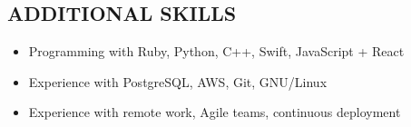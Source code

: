 \documentclass[centered, margin, 11pt]{res} %
\newcommand\mainsectionfont{\fontsize{10.5pt}{14pt}\selectfont\bf\textup}
\renewcommand\sectionfont{\mainsectionfont} %
\renewcommand\dates{\section} %
\newenvironment{rlist}
    {\begin{minipage}[t]{\linewidth}\begin{itemize}\raggedright}
    {\end{itemize}\end{minipage}}
\newenvironment{positionlist}
    {\begin{position}\begin{rlist}}
    {\end{rlist}\end{position}}
\begin{document}
\begin{resume}



\renewcommand\sectionfont{\mainsectionfont} %


\section{ADDITIONAL SKILLS}
\begin{rlist}
  \item Programming with Ruby, Python, C++, Swift, JavaScript + React
  \item Experience with PostgreSQL, AWS, Git, GNU/Linux
  \item Experience with remote work, Agile teams, continuous deployment
\end{rlist}


\end{resume}
\end{document}

